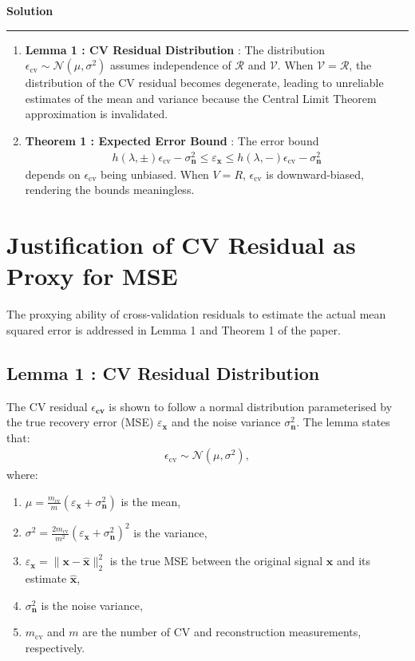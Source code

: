 \documentclass[a4paper,12pt]{article}
\newenvironment{solution}[2][]{%
    \begin{mdframed}[linecolor=blue!70!black, linewidth=2pt, roundcorner=10pt, backgroundcolor=yellow!10!white, skipabove=12pt, skipbelow=12pt]%
        \textbf{\large #2}
        \par\noindent\rule{\textwidth}{0.4pt}
}{
    \end{mdframed}
}
\begin{document}
\begin{solution}{Solution}
  \begin{enumerate}
    \item \textbf{Lemma 1 : CV Residual Distribution} : The distribution $\epsilon_{\text{cv}} \sim \mathcal{N}\left(\mu, \sigma^2\right)$ assumes independence of $\mathcal{R}$ and $\mathcal{V}$. When $\mathcal{V} = \mathcal{R}$, the distribution of the CV residual becomes degenerate, leading to unreliable estimates of the mean and variance because the Central Limit Theorem approximation is invalidated.
    \item \textbf{Theorem 1 : Expected Error Bound} : The error bound 
    \begin{align*}
      h(\lambda, \pm) \epsilon_{\text{cv}} - \sigma_{\mathbf{n}}^2 \leq \varepsilon_{\mathbf{x}} \leq h(\lambda, -) \epsilon_{\text{cv}} - \sigma_{\mathbf{n}}^2 
    \end{align*}
    depends on $\epsilon_{\text{cv}}$ being unbiased. When $ V = R $, $\epsilon_{\text{cv}}$ is downward-biased, rendering the bounds meaningless.
  \end{enumerate}


  \section{Justification of CV Residual as Proxy for MSE}

  The proxying ability of cross-validation residuals to estimate the actual mean squared error is addressed in Lemma 1 and Theorem 1 of the paper.

  \subsection{Lemma 1 : CV Residual Distribution}

  The CV residual $\epsilon_{\textbf{cv}}$ is shown to follow a normal distribution parameterised by the true recovery error (MSE) $\varepsilon_{\mathbf{x}}$ and the noise variance $\sigma_{\mathbf{n}}^2$. The lemma states that:
  \begin{align*}
    \epsilon_{\text{cv}} \sim \mathcal{N}\left(\mu, \sigma^2\right),
  \end{align*} 
  where:
  \begin{enumerate}
      \item $\mu = \frac{m_{\text{cv}}}{m} \left(\varepsilon_{\mathbf{x}} + \sigma_{\mathbf{n}}^2\right)$ is the mean,
      \item $\sigma^2 = \frac{2m_{\text{cv}}}{m^2} \left(\varepsilon_{\mathbf{x}} + \sigma_{\mathbf{n}}^2\right)^2$ is the variance,
      \item $\varepsilon_{\mathbf{x}} = \|\mathbf{x} - \hat{\mathbf{x}}\|_2^2$ is the true MSE between the original signal $\mathbf{x}$ and its estimate $\hat{\mathbf{x}}$,
      \item $\sigma_{\mathbf{n}}^2$ is the noise variance,
      \item $m_{\text{cv}}$ and $m$ are the number of CV and reconstruction measurements, respectively.
  \end{enumerate}


\end{solution}
\end{document}
